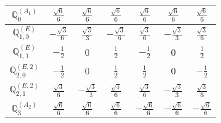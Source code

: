 \documentclass[fleqn,10pt,landscape]{article}
\begin{document}
\begin{itemize}
{\begin{center}
\begin{longtable}{ccccccc}
$\mathbb{Q}_{0}^{(A_{1})}$ & $ \frac{\sqrt{6}}{6} $ & $ \frac{\sqrt{6}}{6} $ & $ \frac{\sqrt{6}}{6} $ & $ \frac{\sqrt{6}}{6} $ & $ \frac{\sqrt{6}}{6} $ & $ \frac{\sqrt{6}}{6} $ \\ \hline
$\mathbb{Q}_{1,0}^{(E)}$ & $ - \frac{\sqrt{3}}{6} $ & $ \frac{\sqrt{3}}{3} $ & $ - \frac{\sqrt{3}}{6} $ & $ \frac{\sqrt{3}}{6} $ & $ - \frac{\sqrt{3}}{3} $ & $ \frac{\sqrt{3}}{6} $ \\ \hline
$\mathbb{Q}_{1,1}^{(E)}$ & $ - \frac{1}{2} $ & $ 0 $ & $ \frac{1}{2} $ & $ - \frac{1}{2} $ & $ 0 $ & $ \frac{1}{2} $ \\ \hline
$\mathbb{Q}_{2,0}^{(E,2)}$ & $ - \frac{1}{2} $ & $ 0 $ & $ \frac{1}{2} $ & $ \frac{1}{2} $ & $ 0 $ & $ - \frac{1}{2} $ \\ \hline
$\mathbb{Q}_{2,1}^{(E,2)}$ & $ \frac{\sqrt{3}}{6} $ & $ - \frac{\sqrt{3}}{3} $ & $ \frac{\sqrt{3}}{6} $ & $ \frac{\sqrt{3}}{6} $ & $ - \frac{\sqrt{3}}{3} $ & $ \frac{\sqrt{3}}{6} $ \\ \hline
$\mathbb{Q}_{3}^{(A_{2})}$ & $ \frac{\sqrt{6}}{6} $ & $ \frac{\sqrt{6}}{6} $ & $ \frac{\sqrt{6}}{6} $ & $ - \frac{\sqrt{6}}{6} $ & $ - \frac{\sqrt{6}}{6} $ & $ - \frac{\sqrt{6}}{6} $ \\
\end{longtable}
\end{center}
}
\end{itemize}
\end{document}

